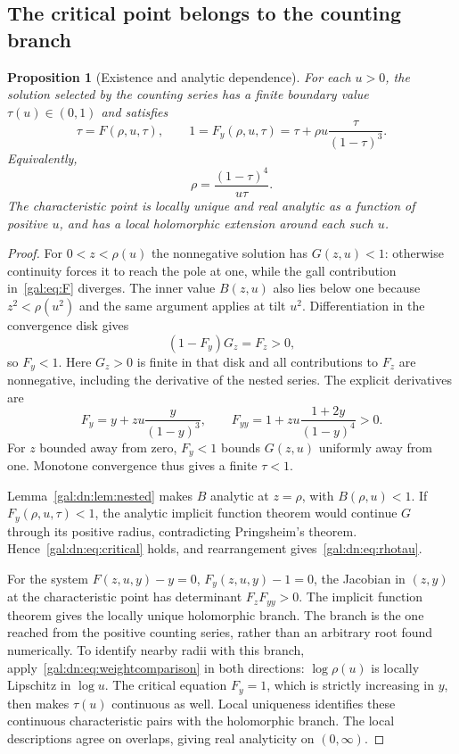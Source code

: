 \documentclass[11pt,letterpaper]{article}
\numberwithin{equation}{section}
\newtheorem{proposition}[theorem]{Proposition}
\theoremstyle{definition}\newtheorem{definition}[theorem]{Definition}
\theoremstyle{remark}\newtheorem{remark}[theorem]{Remark}
\begin{document}
\subsection{The critical point belongs to the counting branch}
\begin{proposition}[Existence and analytic dependence]\label{gal:dn:prop:critical}
For each $u>0$, the solution selected by the counting series has a finite boundary value $\tau(u)\in(0,1)$ and satisfies
\begin{equation}\label{gal:dn:eq:critical}
 \tau=F(\rho,u,\tau),\qquad 1=F_y(\rho,u,\tau)
       =\tau+\rho u\frac{\tau}{(1-\tau)^3}.
\end{equation}
Equivalently,
\begin{equation}\label{gal:dn:eq:rhotau}
 \rho=\frac{(1-\tau)^4}{u\tau}.
\end{equation}
The characteristic point is locally unique and real analytic as a function of positive $u$, and has a local holomorphic extension around each such $u$.
\end{proposition}
\begin{proof}
For $0<z<\rho(u)$ the nonnegative solution has $G(z,u)<1$: otherwise continuity forces it to reach the pole at one, while the gall contribution in~\eqref{gal:eq:F} diverges. The inner value $B(z,u)$ also lies below one because $z^2<\rho(u^2)$ and the same argument applies at tilt $u^2$. Differentiation in the convergence disk gives
\[
 (1-F_y)G_z=F_z>0,
\]
so $F_y<1$. Here $G_z>0$ is finite in that disk and all contributions to $F_z$ are nonnegative, including the derivative of the nested series. The explicit derivatives are
\begin{equation}\label{gal:dn:eq:yderivatives}
 F_y=y+zu\frac{y}{(1-y)^3},\qquad
 F_{yy}=1+zu\frac{1+2y}{(1-y)^4}>0.
\end{equation}
For $z$ bounded away from zero, $F_y<1$ bounds $G(z,u)$ uniformly away from one. Monotone convergence thus gives a finite $\tau<1$.

Lemma~\ref{gal:dn:lem:nested} makes $B$ analytic at $z=\rho$, with $B(\rho,u)<1$. If $F_y(\rho,u,\tau)<1$, the analytic implicit function theorem would continue $G$ through its positive radius, contradicting Pringsheim's theorem. Hence~\eqref{gal:dn:eq:critical} holds, and rearrangement gives~\eqref{gal:dn:eq:rhotau}.

For the system $F(z,u,y)-y=0$, $F_y(z,u,y)-1=0$, the Jacobian in $(z,y)$ at the characteristic point has determinant $F_zF_{yy}>0$. The implicit function theorem gives the locally unique holomorphic branch. The branch is the one reached from the positive counting series, rather than an arbitrary root found numerically. To identify nearby radii with this branch, apply~\eqref{gal:dn:eq:weightcomparison} in both directions: $\log\rho(u)$ is locally Lipschitz in $\log u$. The critical equation $F_y=1$, which is strictly increasing in $y$, then makes $\tau(u)$ continuous as well. Local uniqueness identifies these continuous characteristic pairs with the holomorphic branch. The local descriptions agree on overlaps, giving real analyticity on $(0,\infty)$.
\end{proof}
\end{document}
